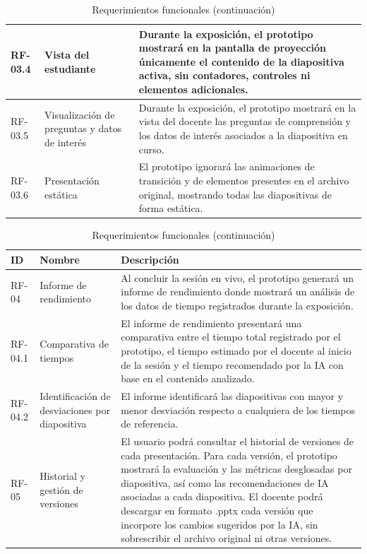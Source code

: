 \documentclass[11pt]{article}
\begin{document}
\begin{table}[H]
\begin{tabular}{|L{1.8cm}|L{4.2cm}|L{8.1cm}|}
        \hline
        RF-03.4 & Vista del estudiante & Durante la exposición, el prototipo mostrará en la pantalla de proyección únicamente el contenido de la diapositiva activa, sin contadores, controles ni elementos adicionales. \\
        \hline
        RF-03.5 & Visualización de preguntas y datos de interés & Durante la exposición, el prototipo mostrará  en la vista del docente las preguntas de comprensión y los datos de interés asociados a la diapositiva en curso. \\
        \hline
        RF-03.6 & Presentación estática & El prototipo ignorará las animaciones de transición y de elementos presentes en el archivo original, mostrando todas las diapositivas de forma estática. \\
        \hline
    \end{tabular}
    \caption{Requerimientos funcionales (continuación)}
\end{table}

\begin{table}[H]
    \centering
    \begin{tabular}{|L{1.8cm}|L{4.2cm}|L{8.1cm}|}
        \hline
        \textbf{ID} & \textbf{Nombre} & \textbf{Descripción} \\
        \hline
        RF-04 & Informe de rendimiento & Al concluir la sesión en vivo, el prototipo generará un informe de rendimiento donde mostrará un análisis de los datos de tiempo registrados durante la exposición. \\
        \hline
        RF-04.1 & Comparativa de tiempos & El informe de rendimiento presentará una comparativa entre el tiempo total registrado por el prototipo, el tiempo estimado por el docente al inicio de la sesión y el tiempo recomendado por la IA con base en el contenido analizado. \\
        \hline
        RF-04.2 & Identificación de desviaciones por diapositiva & El informe identificará las diapositivas con mayor y menor desviación respecto a cualquiera de los tiempos de referencia. \\
        \hline
        RF-05 & Historial y gestión de versiones & El usuario podrá consultar el historial de versiones de cada presentación. Para cada versión, el prototipo mostrará la evaluación y las métricas desglosadas por diapositiva, así como las recomendaciones de IA asociadas a cada diapositiva. El docente podrá descargar en formato .pptx cada versión que incorpore los cambios sugeridos por la IA, sin sobrescribir el archivo original ni otras versiones. \\
        \hline
    \end{tabular}
    \caption{Requerimientos funcionales (continuación)}
\end{table}
\normalsize
\renewcommand{\arraystretch}{1}
\end{document}
